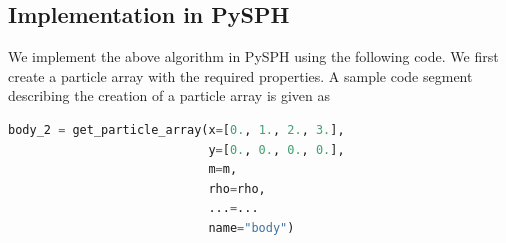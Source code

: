 \FloatBarrier%
\subsection{Implementation in PySPH}
We implement the above algorithm in PySPH using the following code. We first
create a particle array with the required properties. A sample code segment
describing the creation of a particle array is given as
 \lstset{basicstyle=\footnotesize\ttfamily}
\begin{lstlisting}[label={contact:equations},frame=lines,language=Python,upquote=True]
body_2 = get_particle_array(x=[0., 1., 2., 3.],
                            y=[0., 0., 0., 0.],
                            m=m,
                            rho=rho,
                            ...=...
                            name="body")
\end{lstlisting}

